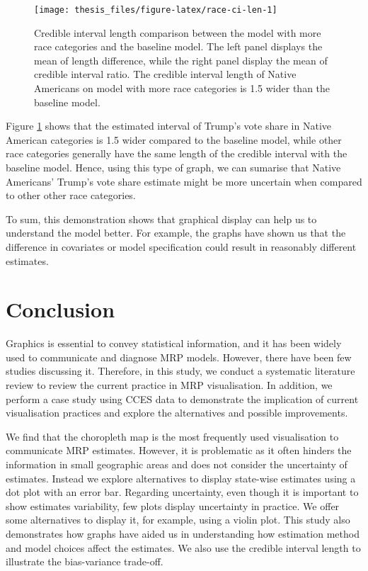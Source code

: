 \documentclass{monashthesis}
\begin{document}
\begin{figure}
\texttt{[image: thesis\_files/figure-latex/race-ci-len-1]} \caption{Credible interval length comparison between the model with more race categories and the baseline model. The left panel displays the mean of length difference, while the right panel display the mean of credible interval ratio. The credible interval length of Native Americans on model with more race categories is 1.5 wider than the baseline model.}\label{fig:race-ci-len}
\end{figure}

Figure \ref{fig:race-ci-len} shows that the estimated interval of Trump's vote share in Native American categories is 1.5 wider compared to the baseline model, while other race categories generally have the same length of the credible interval with the baseline model. Hence, using this type of graph, we can sumarise that Native Americans' Trump's vote share estimate might be more uncertain when compared to other other race categories.

To sum, this demonstration shows that graphical display can help us to understand the model better. For example, the graphs have shown us that the difference in covariates or model specification could result in reasonably different estimates.

\hypertarget{ch:conclusion}{%
\chapter{Conclusion}\label{ch:conclusion}}

Graphics is essential to convey statistical information, and it has been widely used to communicate and diagnose MRP models. However, there have been few studies discussing it. Therefore, in this study, we conduct a systematic literature review to review the current practice in MRP visualisation. In addition, we perform a case study using CCES data to demonstrate the implication of current visualisation practices and explore the alternatives and possible improvements.

We find that the choropleth map is the most frequently used visualisation to communicate MRP estimates. However, it is problematic as it often hinders the information in small geographic areas and does not consider the uncertainty of estimates. Instead we explore alternatives to display state-wise estimates using a dot plot with an error bar. Regarding uncertainty, even though it is important to show estimates variability, few plots display uncertainty in practice. We offer some alternatives to display it, for example, using a violin plot. This study also demonstrates how graphs have aided us in understanding how estimation method and model choices affect the estimates. We also use the credible interval length to illustrate the bias-variance trade-off.
\end{document}

